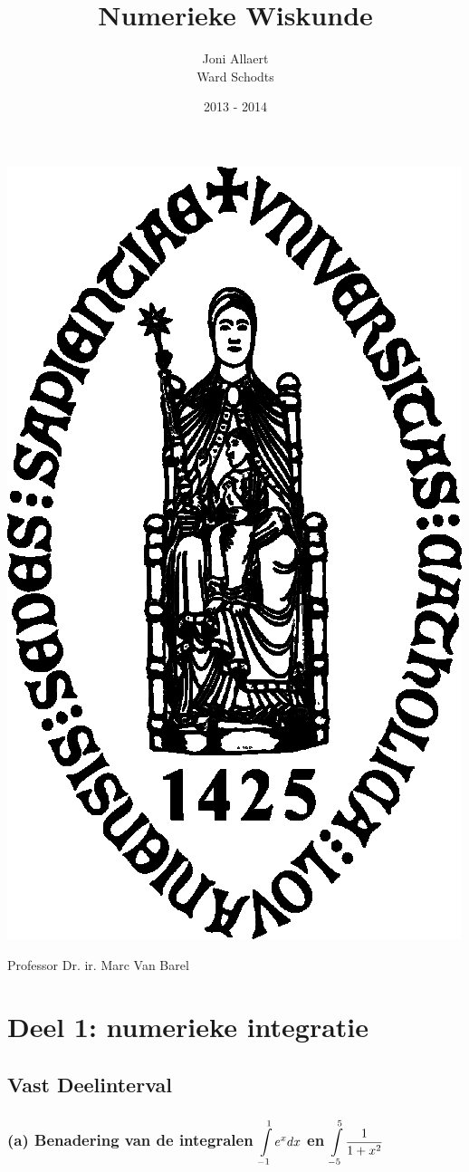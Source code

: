 \documentclass[11pt,a4paper]{article}
\begin{document}
\title{\Huge Numerieke Wiskunde}
\author{Joni Allaert\\
		Ward Schodts\\
		}

\date{2013 - 2014}
\maketitle
\thispagestyle{empty}

\newcount\mycount
\begin{center}

\includegraphics[scale=0.4]{KULzwart.png}

\end{center}
\begin{center}
\Large Professor Dr. ir. Marc Van Barel
\vfill
\end{center}
\titlepage
\section{Deel 1: numerieke integratie}
\subsection{Vast Deelinterval}
\subsubsection*{(a) Benadering van de integralen $\mathop{\mathlarger{\int\limits_{-1}^1e^xdx}}$ en  $\mathop{\mathlarger{\int\limits_{-5}^5\frac{1}{1+x^2}}}$}
\end{document}
